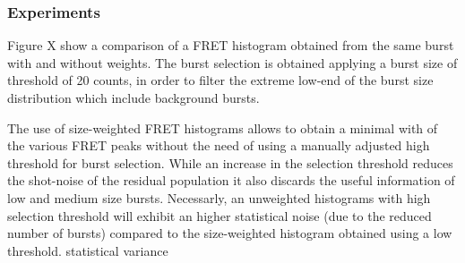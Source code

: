 \subsubsection{Experiments}
Figure X show a comparison of a FRET histogram obtained from the same burst
with and without weights. The burst selection is obtained applying a burst size
of threshold of 20 counts, in order to filter the extreme low-end of the burst size
distribution which include background bursts.

The use of size-weighted FRET histograms allows to obtain a minimal with of
the various FRET peaks without the need of using a manually adjusted high
threshold for burst selection. While an increase in the selection threshold
reduces the shot-noise of the residual population it also discards the useful 
information of low and medium size bursts. Necessarly, an unweighted histograms
with high selection threshold will exhibit an higher statistical noise
(due to the reduced number of bursts) compared to the size-weighted histogram
obtained using a low threshold.
statistical variance
